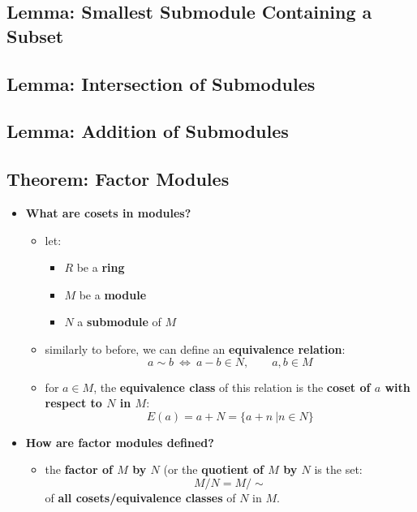 \documentclass{exam}
\begin{document}
\subsection{Lemma: Smallest Submodule Containing a Subset}


\subsection{Lemma: Intersection of Submodules}


\subsection{Lemma: Addition of Submodules}


\subsection{Theorem: Factor Modules}

\begin{itemize}
    \item \textbf{What are cosets in modules?}
    \begin{itemize}
        \item let:\begin{itemize}
            \item $R$ be a \textbf{ring}
            \item $M$ be a \textbf{module}
            \item $N$ a \textbf{submodule} of $M$
        \end{itemize} 
        \item similarly to before, we can define an \textbf{equivalence relation}:
        \[
        a \sim b \ \iff \ a - b \in N, \qquad a,b \in M
        \]
        \item for $a \in M$, the \textbf{equivalence class} of this relation is the \textbf{coset of $a$ with respect to $N$ in $M$}:
        \[
        E(a) = a + N = \{a + n \ | n \in N\}
        \]
    \end{itemize}
    \item \textbf{How are factor modules defined?}
    \begin{itemize}
        \item the \textbf{factor of $M$ by $N$} (or the \textbf{quotient of $M$ by $N$} is the set:
        \[
        M/N = M/\sim
        \]
        of \textbf{all cosets/equivalence classes} of $N$ in $M$.
    \end{itemize}
\end{itemize}
\end{document}

